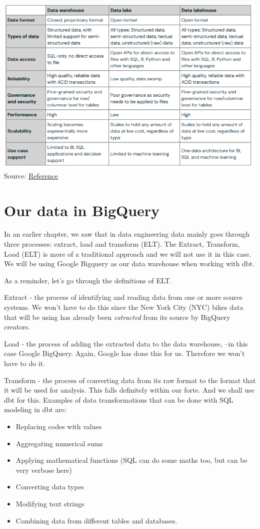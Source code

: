 \documentclass[
]{book}
\providecommand{\tightlist}{%
  \setlength{\itemsep}{0pt}\setlength{\parskip}{0pt}}
\begin{document}
\includegraphics{./images/data_storages.png}
Source: \href{https://www.databricks.com/blog/2021/05/19/evolution-to-the-data-lakehouse.html}{Reference}

\hypertarget{our-data-in-bigquery}{%
\chapter{Our data in BigQuery}\label{our-data-in-bigquery}}

In an earlier chapter, we saw that in data engineering data mainly goes through three processes: extract, load and transform (ELT). The Extract, Transform, Load (ELT) is more of a traditional approach and we will not use it in this case. We will be using Google Bigquery as our data warehouse when working with dbt.

As a reminder, let's go through the definitions of ELT.

Extract - the process of identifying and reading data from one or more source systems. We won't have to do this since the New York City (NYC) bikes data that will be using has already been \emph{extracted} from its source by BigQuery creators.

Load - the process of adding the extracted data to the data warehouse, --in this case Google BigQuery. Again, Google has done this for us. Therefore we won't have to do it.

Transform - the process of converting data from its raw format to the format that it will be used for analysis. This falls definitely within our forte. And we shall use dbt for this. Examples of data transformations that can be done with SQL modeling in dbt are:

\begin{itemize}
\tightlist
\item
  Replacing codes with values
\item
  Aggregating numerical sums
\item
  Applying mathematical functions (SQL can do some maths too, but can be very verbose here)
\item
  Converting data types
\item
  Modifying text strings
\item
  Combining data from different tables and databases.
\end{itemize}
\end{document}

